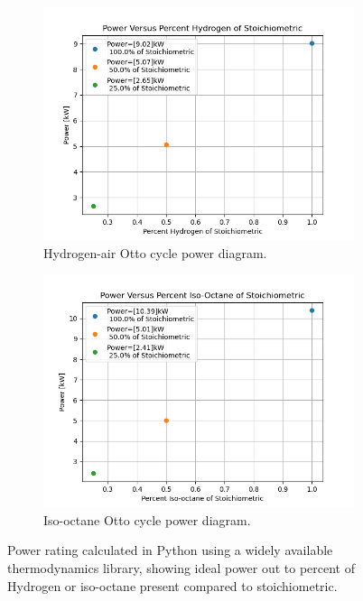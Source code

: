 \documentclass[conf]{new-aiaa}
\begin{document}
\begin{figure}[H]
\centering
\begin{subfigure}{0.5\linewidth}
  \centering
  \includegraphics[width=1\linewidth]{Figures/Hydrogen/power_v_e.png}
  \caption{Hydrogen-air Otto cycle power diagram.}
  \label{fig:power_diag_h2}
\end{subfigure}%
\begin{subfigure}{0.5\linewidth}
  \centering
  \includegraphics[width=1\linewidth]{Figures/Iso-octane/power_v_e.png}
  \caption{Iso-octane Otto cycle power diagram.}
  \label{fig:power_diag_iso}
\end{subfigure}
\caption{Power rating calculated in Python using a widely available thermodynamics library, showing ideal power out to percent of Hydrogen or iso-octane present compared to stoichiometric.}
\label{fig:power_diag}
\end{figure}
\end{document}
